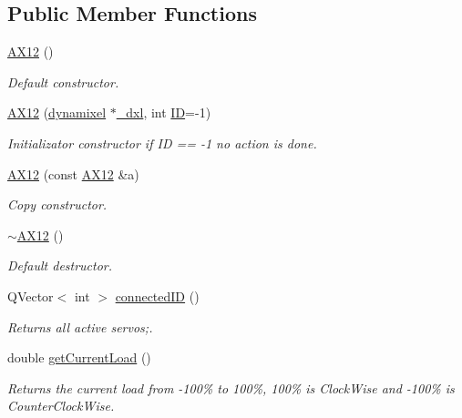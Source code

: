 \subsection*{Public Member Functions}
\begin{DoxyCompactItemize}
\item 
\hyperlink{a00001_ab7c557985e755d6119e5e2d979f928ae}{A\+X12} ()
\begin{DoxyCompactList}\small\item\em Default constructor. \end{DoxyCompactList}\item 
\hyperlink{a00001_a205be9b4dde785bd40b88f575a64f4d8}{A\+X12} (\hyperlink{a00004}{dynamixel} $\ast$\hyperlink{a00001_a16df7ccc0a8d3c585a93b6916734bb17}{\+\_\+dxl}, int \hyperlink{a00001_a08d272b502d65464202a3aa97825aec0ab2565d5698c9d943a8bcecf02b1389ad}{I\+D}=-\/1)
\begin{DoxyCompactList}\small\item\em Initializator constructor if I\+D == -\/1 no action is done. \end{DoxyCompactList}\item 
\hyperlink{a00001_a37b76666533323ec317f5156dbef2a89}{A\+X12} (const \hyperlink{a00001}{A\+X12} \&a)
\begin{DoxyCompactList}\small\item\em Copy constructor. \end{DoxyCompactList}\item 
\hyperlink{a00001_a5e9382e65479cdcb248f5303ac4c96d9}{$\sim$\+A\+X12} ()
\begin{DoxyCompactList}\small\item\em Default destructor. \end{DoxyCompactList}\item 
Q\+Vector$<$ int $>$ \hyperlink{a00001_a2fa05296aa57896a5cb0ef4ce0aa96f1}{connected\+I\+D} ()
\begin{DoxyCompactList}\small\item\em Returns all active servos;. \end{DoxyCompactList}\item 
double \hyperlink{a00001_a0bd930c81b7a9c088ecab789b3a7e525}{get\+Current\+Load} ()
\begin{DoxyCompactList}\small\item\em Returns the current load from -\/100\% to 100\%, 100\% is Clock\+Wise and -\/100\% is Counter\+Clock\+Wise. \end{DoxyCompactList}\item 

\end{DoxyCompactItemize}

